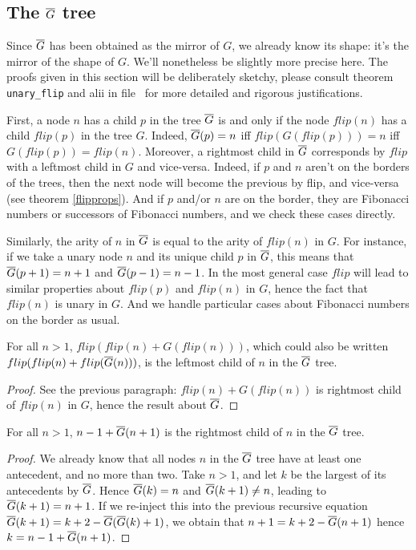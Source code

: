 \documentclass[a4paper,11pt]{article}
\begin{document}
\subsection{The $\overline{G}$ tree}

Since $\overline{G}$ has been obtained as the mirror of $G$, we already
know its shape: it's the mirror of the shape of $G$. We'll
nonetheless be slightly more precise here. The proofs given
in this section will be deliberately sketchy, please consult
theorem {\tt unary\_flip} and alii in file \ for
more detailed and rigorous justifications.

First, a node
$n$ has a child $p$ in the tree $\overline{G}$ is and only if the
node $flip(n)$ has a child $flip(p)$ in the tree $G$.
Indeed, $\overline{G}(p)=n$ iff $flip(G(flip(p)))=n$ iff
$G(flip(p))=flip(n)$. Moreover, a rightmost child in $\overline{G}$
corresponds by $flip$ with a leftmost child in $G$ and vice-versa.
Indeed, if $p$ and $n$ aren't on the borders of the trees,
then the next node will become the previous by flip, and vice-versa
(see theorem \ref{flipprops}). And if $p$ and/or $n$ are on the
border, they are Fibonacci numbers or successors of Fibonacci
numbers, and we check these cases directly.

Similarly, the arity of $n$ in $\overline{G}$ is equal to the arity of
$flip(n)$ in $G$.
For instance, if we take a unary node $n$ and its unique
child $p$ in $\overline{G}$, this means that $\overline{G}(p+1)=n+1$ and
$\overline{G}(p-1)=n-1$. In the most general case $flip$ will lead
to similar properties about $flip(p)$ and $flip(n)$ in $G$,
hence the fact that $flip(n)$ is unary in $G$. And we handle
particular cases about Fibonacci numbers on the border as usual.

\begin{theorem}
For all $n>1$, $flip(flip(n)+G(flip(n)))$, which could also be
written $flip(flip(n)+flip(\overline{G}(n)))$, is the leftmost child
of $n$ in the $\overline{G}$ tree. 
\end{theorem}
\begin{proof}
See the previous paragraph: $flip(n)+G(flip(n))$ is rightmost
child of $flip(n)$ in $G$, hence the result about $\overline{G}$.
\end{proof}

\begin{theorem}
For all $n>1$, $n-1+\overline{G}(n+1)$ is the rightmost child of $n$ in the
$\overline{G}$ tree.
\end{theorem}
\begin{proof}
We already know that all nodes $n$ in the $\overline{G}$ tree have at
least one antecedent, and no more than two.
Take $n>1$, and let $k$ be the largest of its antecedents by $\overline{G}$.
Hence $\overline{G}(k)=n$ and $\overline{G}(k+1)\neq n$, leading to $\overline{G}(k+1)=n+1$.
If we re-inject this into the previous recursive equation
$\overline{G}(k+1) = k+2 - \overline{G}(\overline{G}(k)+1)$,
we obtain that $n+1 = k+2-\overline{G}(n+1)$ hence $k=n-1+\overline{G}(n+1)$.
\end{proof}
\end{document}
